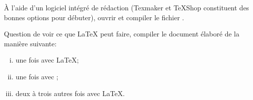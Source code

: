 \begin{exercice}[nosol]
  À l'aide d'un logiciel intégré de rédaction (Texmaker et TeXShop
  constituent des bonnes options pour débuter), ouvrir et compiler le
  fichier .
\end{exercice}

\begin{exercice}[nosol]
  Question de voir ce que {\LaTeX} peut faire, compiler le document
  élaboré  de la manière suivante:
  \begin{enumerate}[i)]
  \item une fois avec {\LaTeX};
  \item une fois avec {\BibTeX};
  \item deux à trois autres fois avec {\LaTeX}.
  \end{enumerate}
\end{exercice}


